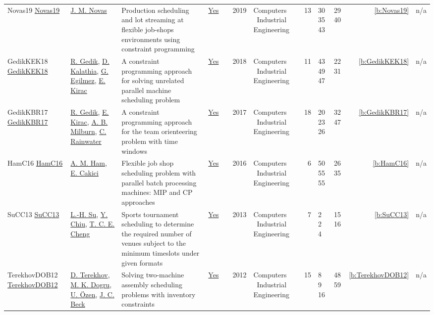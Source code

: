 {\begin{longtable}{>{\raggedright\arraybackslash}p{3cm}>{\raggedright\arraybackslash}p{4.5cm}>{\raggedright\arraybackslash}p{6.0cm}rrrp{2.5cm}rp{1cm}p{1cm}rr}
Novas19 \href{https://doi.org/10.1016/j.cie.2019.07.011}{Novas19} & \hyperref[auth:a524]{J. M. Novas} & Production scheduling and lot streaming at flexible job-shops environments using constraint programming & \href{../works/Novas19.pdf}{Yes} & \cite{Novas19} & 2019 & Computers \  Industrial Engineering & 13 & 30 35 43 & 29 40 & \ref{b:Novas19} & n/a\\
GedikKEK18 \href{https://doi.org/10.1016/j.cie.2018.05.014}{GedikKEK18} & \hyperref[auth:a560]{R. Gedik}, \hyperref[auth:a561]{D. Kalathia}, \hyperref[auth:a562]{G. Egilmez}, \hyperref[auth:a563]{E. Kirac} & A constraint programming approach for solving unrelated parallel machine scheduling problem & \href{../works/GedikKEK18.pdf}{Yes} & \cite{GedikKEK18} & 2018 & Computers \  Industrial Engineering & 11 & 43 49 47 & 22 31 & \ref{b:GedikKEK18} & n/a\\
GedikKBR17 \href{http://dx.doi.org/10.1016/j.cie.2017.03.017}{GedikKBR17} & \hyperref[auth:a560]{R. Gedik}, \hyperref[auth:a563]{E. Kirac}, \hyperref[auth:a1156]{A. B. Milburn}, \hyperref[auth:a1157]{C. Rainwater} & \cellcolor{green!10}A constraint programming approach for the team orienteering problem with time windows & \href{../works/GedikKBR17.pdf}{Yes} & \cite{GedikKBR17} & 2017 & Computers \  Industrial Engineering & 18 & 20 23 26 & 32 47 & \ref{b:GedikKBR17} & n/a\\
HamC16 \href{http://dx.doi.org/10.1016/j.cie.2016.11.001}{HamC16} & \hyperref[auth:a770]{A. M. Ham}, \hyperref[auth:a875]{E. Cakici} & Flexible job shop scheduling problem with parallel batch processing machines: MIP and CP approaches & \href{../works/HamC16.pdf}{Yes} & \cite{HamC16} & 2016 & Computers \  Industrial Engineering & 6 & 50 55 55 & 26 35 & \ref{b:HamC16} & n/a\\
SuCC13 \href{http://dx.doi.org/10.1016/j.cie.2013.02.021}{SuCC13} & \hyperref[auth:a1401]{L.-H. Su}, \hyperref[auth:a1402]{Y. Chiu}, \hyperref[auth:a1403]{T. C. E. Cheng} & Sports tournament scheduling to determine the required number of venues subject to the minimum timeslots under given formats & \href{../works/SuCC13.pdf}{Yes} & \cite{SuCC13} & 2013 & Computers \  Industrial Engineering & 7 & 2 2 4 & 15 16 & \ref{b:SuCC13} & n/a\\
TerekhovDOB12 \href{https://doi.org/10.1016/j.cie.2012.02.006}{TerekhovDOB12} & \hyperref[auth:a818]{D. Terekhov}, \hyperref[auth:a820]{M. K. Dogru}, \hyperref[auth:a821]{U. {\"{O}}zen}, \hyperref[auth:a89]{J. C. Beck} & Solving two-machine assembly scheduling problems with inventory constraints & \href{../works/TerekhovDOB12.pdf}{Yes} & \cite{TerekhovDOB12} & 2012 & Computers \  Industrial Engineering & 15 & 8 9 16 & 48 59 & \ref{b:TerekhovDOB12} & n/a\\

\end{longtable}}
